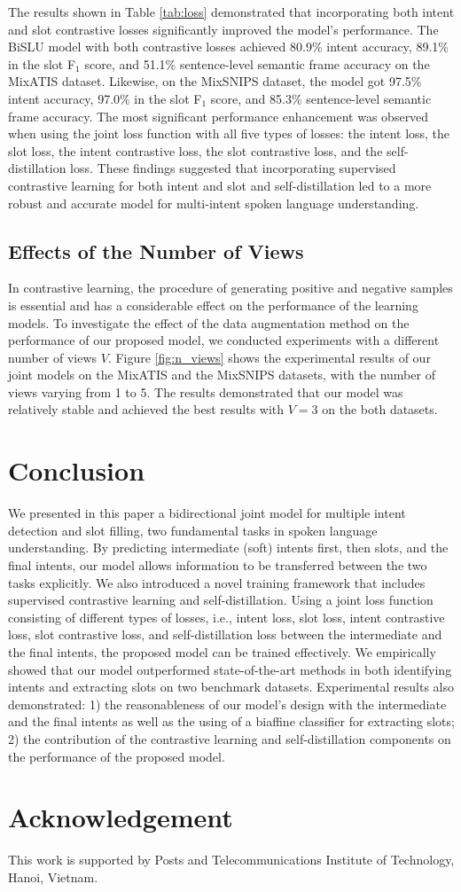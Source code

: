 \documentclass{ecai}
\begin{document}
The results shown in Table \ref{tab:loss} demonstrated that incorporating both intent and slot contrastive losses significantly improved the model's performance. The BiSLU model with both contrastive losses achieved 80.9\% intent accuracy, 89.1\% in the slot F$_1$ score, and 51.1\% sentence-level semantic frame accuracy on the MixATIS dataset. Likewise, on the MixSNIPS dataset, the model got 97.5\% intent accuracy, 97.0\% in the slot F$_1$ score, and 85.3\% sentence-level semantic frame accuracy. The most significant performance enhancement was observed when using the joint loss function with all five types of losses: the intent loss, the slot loss, the intent contrastive loss, the slot contrastive loss, and the self-distillation loss. These findings suggested that incorporating supervised contrastive learning for both intent and slot and self-distillation led to a more robust and accurate model for multi-intent spoken language understanding.

\subsection{Effects of the Number of Views}
In contrastive learning, the procedure of generating positive and negative samples is essential and has a considerable effect on the performance of the learning models. To investigate the effect of the data augmentation method on the performance of our proposed model, we conducted experiments with a different number of views $V$. Figure \ref{fig:n_views} shows the experimental results of our joint models on the MixATIS and the MixSNIPS datasets, with the number of views varying from 1 to 5. The results demonstrated that our model was relatively stable and achieved the best results with $V = 3$ on the both datasets.    
\section{Conclusion}
We presented in this paper a bidirectional joint model for multiple intent detection and slot filling, two fundamental tasks in spoken language understanding. By predicting intermediate (soft) intents first, then slots, and the final intents, our model allows information to be transferred between the two tasks explicitly. We also introduced a novel training framework that includes supervised contrastive learning and self-distillation. Using a joint loss function consisting of different types of losses, i.e., intent loss, slot loss, intent contrastive loss, slot contrastive loss, and self-distillation loss between the intermediate and the final intents, the proposed model can be trained effectively. We empirically showed that our model outperformed state-of-the-art methods in both identifying intents and extracting slots on two benchmark datasets. Experimental results also demonstrated:  1) the reasonableness of our model’s design with the intermediate and the final intents as well as the using of a biaffine classifier for extracting slots; 2) the contribution of the contrastive learning and self-distillation components on the performance of the proposed model.   

\section*{Acknowledgement}
This work is supported by Posts and Telecommunications Institute of Technology, Hanoi, Vietnam.

\end{document}
